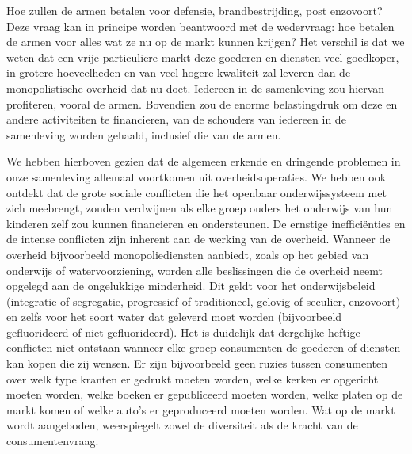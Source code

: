 \documentclass[
  a5paper,
  smalldemyvopaper,10pt,twoside,onecolumn,openright,extrafontsizes,hidelinks]{memoir}
\begin{document}
Hoe zullen de armen betalen voor defensie, brandbestrijding, post
enzovoort? Deze vraag kan in principe worden beantwoord met de
wedervraag: hoe betalen de armen voor alles wat ze nu op de markt kunnen
krijgen? Het verschil is dat we weten dat een vrije particuliere markt
deze goederen en diensten veel goedkoper, in grotere hoeveelheden en van
veel hogere kwaliteit zal leveren dan de monopolistische overheid dat nu
doet. Iedereen in de samenleving zou hiervan profiteren, vooral de
armen. Bovendien zou de enorme belastingdruk om deze en andere
activiteiten te financieren, van de schouders van iedereen in de
samenleving worden gehaald, inclusief die van de armen.

We hebben hierboven gezien dat de algemeen erkende en dringende
problemen in onze samenleving allemaal voortkomen uit
overheidsoperaties. We hebben ook ontdekt dat de grote sociale
conflicten die het openbaar onderwijssysteem met zich meebrengt, zouden
verdwijnen als elke groep ouders het onderwijs van hun kinderen zelf zou
kunnen financieren en ondersteunen. De ernstige inefficiënties en de
intense conflicten zijn inherent aan de werking van de overheid. Wanneer
de overheid bijvoorbeeld monopoliediensten aanbiedt, zoals op het gebied
van onderwijs of watervoorziening, worden alle beslissingen die de
overheid neemt opgelegd aan de ongelukkige minderheid. Dit geldt voor
het onderwijsbeleid (integratie of segregatie, progressief of
traditioneel, gelovig of seculier, enzovoort) en zelfs voor het soort
water dat geleverd moet worden (bijvoorbeeld gefluorideerd of
niet-gefluorideerd). Het is duidelijk dat dergelijke heftige conflicten
niet ontstaan wanneer elke groep consumenten de goederen of diensten kan
kopen die zij wensen. Er zijn bijvoorbeeld geen ruzies tussen
consumenten over welk type kranten er gedrukt moeten worden, welke
kerken er opgericht moeten worden, welke boeken er gepubliceerd moeten
worden, welke platen op de markt komen of welke auto's er geproduceerd
moeten worden. Wat op de markt wordt aangeboden, weerspiegelt zowel de
diversiteit als de kracht van de consumentenvraag.
\end{document}
